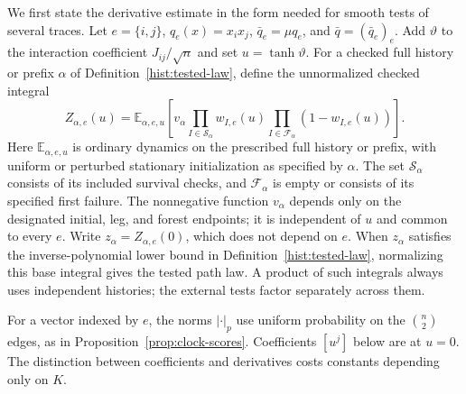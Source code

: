 We first state the derivative estimate in the form needed for smooth tests
of several traces.  Let $e=\{i,j\}$, $q_e(x)=x_i x_j$,
$\bar q_e=\mu q_e$, and $\bar q=(\bar q_e)_e$.  Add $\vartheta$ to the
interaction coefficient $J_{ij}/\sqrt n$ and set $u=\tanh\vartheta$.
For a checked full history or prefix $\alpha$ of
Definition~\ref{hist:tested-law}, define the unnormalized checked integral
\begin{equation}\label{repl:tested-integral}
 Z_{\alpha,e}(u)=
 \mathbb E_{\alpha,e,u}\left[
   v_\alpha
   \prod_{I\in\mathscr S_\alpha}w_{I,e}(u)
   \prod_{I\in\mathscr F_\alpha}(1-w_{I,e}(u))\right].
\end{equation}
Here $\mathbb E_{\alpha,e,u}$ is ordinary dynamics on the prescribed full
history or prefix, with uniform or perturbed stationary initialization as
specified by $\alpha$.  The set $\mathscr S_\alpha$ consists of its included
survival checks, and $\mathscr F_\alpha$ is empty or consists of its specified
first failure.  The nonnegative function $v_\alpha$ depends only on the
designated initial, leg, and forest endpoints; it is independent of $u$ and
common to every $e$.  Write $z_\alpha=Z_{\alpha,e}(0)$, which does not depend
on $e$.  When $z_\alpha$ satisfies the inverse-polynomial lower bound in
Definition~\ref{hist:tested-law}, normalizing this base integral gives the
tested path law.  A product of such integrals always uses independent histories;
the external tests factor separately across them.

For a vector indexed by $e$, the norms $|\cdot|_p$ use uniform probability
on the $\binom n2$ edges, as in Proposition~\ref{prop:clock-scores}.  Coefficients
$[u^j]$ below are at $u=0$.  The distinction between coefficients and
derivatives costs constants depending only on $K$.

